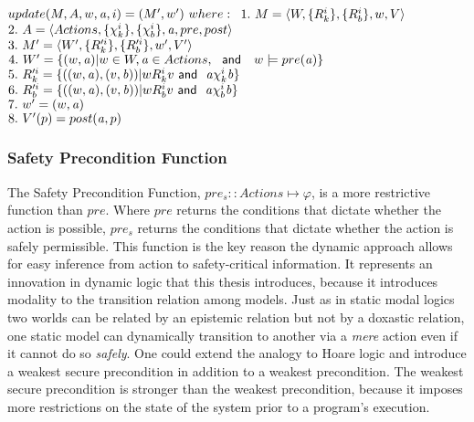 $update(M,A,w,\laa,i) = (M',w')\ where:\\$
$1.\  M = \langle W, \{R_{k}^{i}\}, \{R_{b}^{i}\}, w, V \rangle$\\
$2.\  A = \langle Actions, \{\chi_{k}^i\}, \{\chi_{b}^i\}, \mathit{a}, pre, post \rangle$\\
$3.\  M' = \langle W', \{R_{k}'^{i}\}, \{R_{b}'^{i}\}, w', V' \rangle$\\
$4.\  W' = \{(w,\mathit{a}) | w\in W,\mathit{a} \in Actions,\ \textsf{\ and \ }\ w\models pre(\mathit{a})\}$\\
$5.\  R_{k}'^{i} = \{((w,\mathit{a}),(v,\mathit{b}))|wR_{k}^i v \textsf{\ and \ } \mathit{a} \chi_{k}^i \mathit{b} \}$\\
$6.\  R_{b}'^{i} = \{((w,\mathit{a}),(v,\mathit{b}))|wR_{b}^i v \textsf{\ and \ } \mathit{a} \chi_{b}^i \mathit{b} \}$\\
$7.\  w' = (w,\mathit{a})$\\ 
$8.\  V'(p) = post(\mathit{a},p)$

\subsubsection{Safety Precondition Function}
The Safety Precondition Function, $pre_s :: Actions \mapsto \varphi$, is a more restrictive function than $pre$. Where $pre$ returns the conditions that dictate whether the action is possible, $pre_s$ returns the conditions that dictate whether the action is safely permissible. This function is the key reason the dynamic approach allows for easy inference from action to safety-critical information. It represents an innovation in dynamic logic that this thesis introduces, because it introduces modality to the transition relation among models. Just as in static modal logics two worlds can be related by an epistemic relation but not by a doxastic relation, one static model can dynamically transition to another via a \emph{mere} action even if it cannot do so \emph{safely}. One could extend the analogy to Hoare logic and introduce a weakest secure precondition in addition to a weakest precondition. The weakest secure precondition is stronger than the weakest precondition, because it imposes more restrictions on the state of the system prior to a program's execution.

